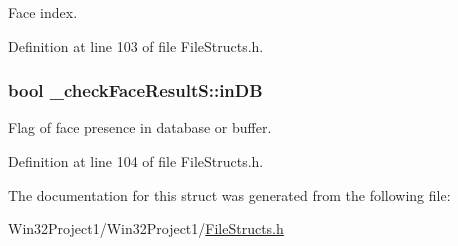 Face index. 



Definition at line 103 of file File\+Structs.\+h.

\subsubsection[{\texorpdfstring{in\+DB}{inDB}}]{\setlength{\rightskip}{0pt plus 5cm}bool \+\_\+check\+Face\+Result\+S\+::in\+DB}\hypertarget{struct__check_face_result_s_aa7353d6109af6ce0a9b2c8c07e09a48b}{}\label{struct__check_face_result_s_aa7353d6109af6ce0a9b2c8c07e09a48b}


Flag of face presence in database or buffer. 



Definition at line 104 of file File\+Structs.\+h.



The documentation for this struct was generated from the following file\+:\begin{DoxyCompactItemize}
\item 
Win32\+Project1/\+Win32\+Project1/\hyperlink{_file_structs_8h}{File\+Structs.\+h}\end{DoxyCompactItemize}
